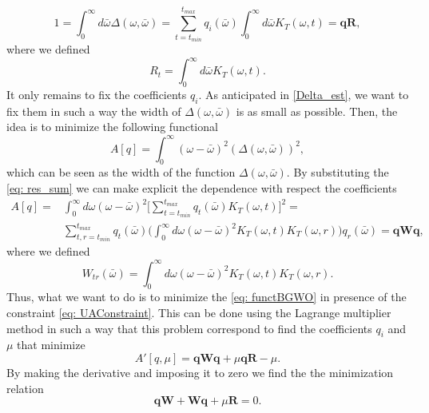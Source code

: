 \documentclass[a4paper,10pt]{article}
\begin{document}
\begin{equation}\label{eq: UAConstraint}
1 = \int_0^\infty d\bar{\omega} \Delta(\omega,\bar{\omega}) = \sum_{t=t_{min}}^{t_{max}} q_i(\bar{\omega})  \int_0^\infty d\bar{\omega}  K_T(\omega,t) = \textbf{q}\textbf{R}, 
\end{equation}
where we defined
\begin{equation}
R_t = \int_0^\infty d\bar{\omega}  K_T(\omega,t).
\end{equation}
It only remains to fix the coefficients $q_i$. As anticipated in \eqref{Delta_est}, we want to fix them in such a way the width of $\Delta(\omega,\bar{\omega})$ is as small as possible. Then, the idea is to minimize the following functional
\begin{equation}
A[q] = \int_0^\infty (\omega-\bar{\omega})^2(\Delta(\omega,\bar{\omega}))^2,
\end{equation}
which can be seen as the width of the function $\Delta(\omega,\bar{\omega})$. By substituting the \eqref{eq: res_sum} we can make explicit the dependence with respect the coefficients 
\begin{equation}\begin{split}\label{eq: functBGWO}
A[q] = & \int_0^\infty d\omega (\omega-\bar{\omega})^2 \big[ \sum_{t=t_{min}}^{t_{max}} q_t(\bar{\omega}) K_T(\omega,t) \big]^2 = \\ &  \sum_{t,r=t_{min}}^{t_{max}} q_t(\bar{\omega}) \bigg( \int_0^\infty  d\omega(\omega-\bar{\omega})^2 K_T(\omega, t) K_T(\omega, r) \bigg) q_r(\bar{\omega}) = \textbf{q}\textbf{W}\textbf{q}, 
\end{split}\end{equation} 
where we defined 
\begin{equation}
W_{tr}(\bar{\omega}) = \int_0^\infty d\omega (\omega-\bar{\omega})^2 K_T(\omega, t) K_T(\omega, r).
\end{equation}
Thus, what we want to do is to minimize the \eqref{eq: functBGWO} in presence of the constraint \eqref{eq: UAConstraint}. This can be done using the Lagrange multiplier method in such a way that this problem correspond to find the coefficients $q_i$ and $\mu$ that minimize 
\begin{equation}
A'[q, \mu] =  \textbf{q}\textbf{W}\textbf{q} + \mu \textbf{q}\textbf{R} - \mu.
\end{equation}
By making the derivative and imposing it to zero we find the the minimization relation
\begin{equation}\label{eq: MinCondBG}
\textbf{q}\textbf{W} + \textbf{W}\textbf{q} + \mu\textbf{R}  = 0.
\end{equation}
\end{document}
